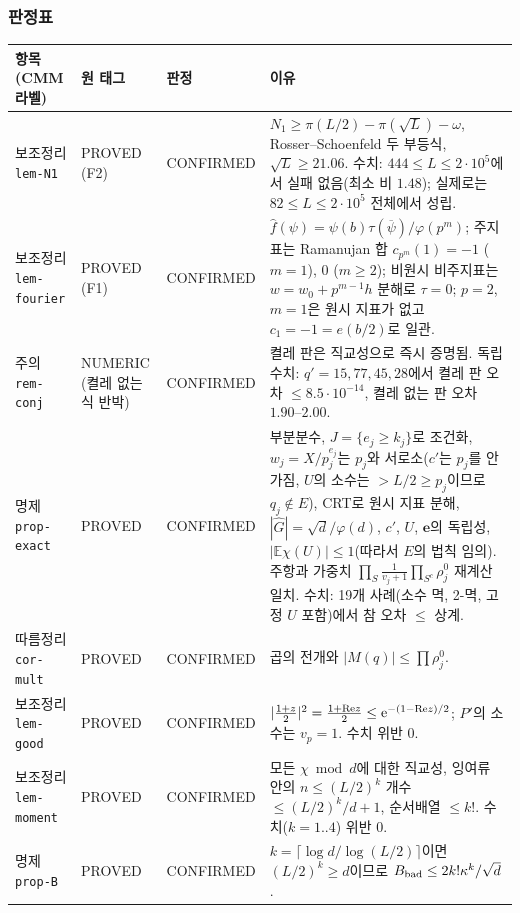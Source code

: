 \subsubsection{판정표}\label{AUD1:ssec-verdict}
\begin{center}\small
\begin{longtable}{p{}p{}p{}p{}}
\toprule
항목 (CMM 라벨) & 원 태그 & 판정 & 이유\\\midrule
\endhead
보조정리 \texttt{lem-N1} & PROVED (F2) & CONFIRMED & $N_1\ge\pi(L/2)-\pi(\sqrt L)-\omega$, Rosser--Schoenfeld 두 부등식, $\sqrt L\ge21.06$. 수치: $444\le L\le2\cdot10^5$에서 실패 없음(최소 비 $1.48$); 실제로는 $82\le L\le2\cdot10^5$ 전체에서 성립.\\
보조정리 \texttt{lem-fourier} & PROVED (F1) & CONFIRMED & $\hat f(\psi)=\psi(b)\tau(\overline\psi)/\varphi(p^m)$; 주지표는 Ramanujan 합 $c_{p^m}(1)=-1$ ($m=1$), $0$ ($m\ge2$); 비원시 비주지표는 $w=w_0+p^{m-1}h$ 분해로 $\tau=0$; $p=2$, $m=1$은 원시 지표가 없고 $c_1=-1=e(b/2)$로 일관.\\
주의 \texttt{rem-conj} & NUMERIC (켤레 없는 식 반박) & CONFIRMED & 켤레 판은 직교성으로 즉시 증명됨. 독립 수치: $q'=15,77,45,28$에서 켤레 판 오차 $\le8.5\cdot10^{-14}$, 켤레 없는 판 오차 $1.90$--$2.00$.\\
명제 \texttt{prop-exact} & PROVED & CONFIRMED & 부분분수, $J=\{e_j\ge k_j\}$로 조건화, $w_j=X/p_j^{e_j}$는 $p_j$와 서로소($c'$는 $p_j$를 안 가짐, $U$의 소수는 $>L/2\ge p_j$이므로 $q_j\notin E$), CRT로 원시 지표 분해, $|\hat G|=\sqrt d/\varphi(d)$, $c'$, $U$, $\mathbf e$의 독립성, $|\mathbb E\chi(U)|\le1$(따라서 $E$의 법칙 임의). 주항과 가중치 $\prod_{S}\frac1{v_j+1}\prod_{S^c}\rho^0_j$ 재계산 일치. 수치: 19개 사례(소수 멱, 2-멱, 고정 $U$ 포함)에서 참 오차 $\le$ 상계.\\
따름정리 \texttt{cor-mult} & PROVED & CONFIRMED & 곱의 전개와 $|M(q)|\le\prod\rho^0_j$.\\
보조정리 \texttt{lem-good} & PROVED & CONFIRMED & $|\tfrac{1+z}2|^2=\tfrac{1+\mathrm{Re}z}2\le\mathrm{e}^{-(1-\mathrm{Re}z)/2}$; $P'$의 소수는 $v_p=1$. 수치 위반 0.\\
보조정리 \texttt{lem-moment} & PROVED & CONFIRMED & 모든 $\chi\bmod d$에 대한 직교성, 잉여류 안의 $n\le(L/2)^k$ 개수 $\le(L/2)^k/d+1$, 순서배열 $\le k!$. 수치($k=1..4$) 위반 0.\\
명제 \texttt{prop-B} & PROVED & CONFIRMED & $k=\lceil\log d/\log(L/2)\rceil$이면 $(L/2)^k\ge d$이므로 $B_{\rm bad}\le2k!\kappa^k/\sqrt d$.\\

\end{longtable}
\end{center}
